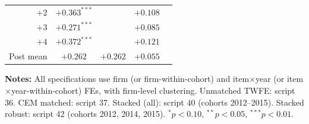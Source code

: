\begin{table}[htbp]
\begin{tabular}{rcccc}
$+2$ & $+0.363^{***}$ & & $+0.108$ & \\
$+3$ & $+0.271^{***}$ & & $+0.085$ & \\
$+4$ & $+0.372^{***}$ & & $+0.121$ & \\[3pt]
Post mean & $+0.262$ & $+0.262$ & $+0.055$ & \\
\bottomrule
\end{tabular}
\vspace{0.5em}
\begin{minipage}{0.95\textwidth}
\scriptsize{\textbf{Notes:} All specifications use firm (or firm-within-cohort) and item$\times$year (or item$\times$year-within-cohort) FEs, with firm-level clustering. Unmatched TWFE: script 36. CEM matched: script 37. Stacked (all): script 40 (cohorts 2012--2015). Stacked robust: script 42 (cohorts 2012, 2014, 2015). $^{*}p<0.10$, $^{**}p<0.05$, $^{***}p<0.01$.\par}
\end{minipage}
\end{table}
